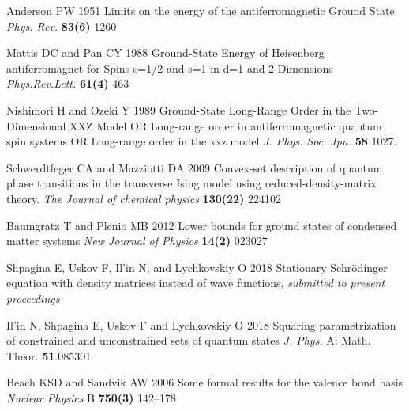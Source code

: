 \documentclass[a4paper]{jpconf}
\renewcommand\[{\begin{equation}}
\renewcommand\]{\end{equation}}
\begin{document}
\begin{thebibliography}{99}



 Anderson PW 1951
Limits on the energy of the antiferromagnetic Ground State
{\it Phys. Rev.} {\bf 83(6)} 1260

 Mattis DC and Pan CY 1988
Ground-State Energy of Heisenberg antiferromagnet for Spins s=1/2 and s=1 in d=1 and 2 Dimensions
{\it Phys.Rev.Lett.} {\bf 61(4)} 463

 Nishimori H and Ozeki Y 1989
Ground-State Long-Range Order in the Two-Dimensional XXZ Model OR
Long-range order in antiferromagnetic quantum spin systems OR
Long-range order in the xxz model
{\it J. Phys. Soc. Jpn.} {\bf 58} 1027.

 Schwerdtfeger CA and Mazziotti DA 2009
Convex-set description of quantum phase transitions in the transverse Ising model using reduced-density-matrix theory. 
{\it The Journal of chemical physics} {\bf 130(22)} 224102

 Baumgratz T and Plenio MB 2012
Lower bounds for ground states of condensed matter systems
{\it New Journal of Physics} {\bf 14(2)} 023027

  Shpagina E, Uskov F, Il'in N, and Lychkovskiy O 2018
Stationary Schrödinger equation with density matrices instead of wave functions,
{\it submitted to present proceedings}

 Il'in N, Shpagina E, Uskov F and Lychkovskiy O 2018
Squaring parametrization of constrained and unconstrained sets of quantum states
{\it J. Phys.} A: Math. Theor. {\bf 51}.085301

 Beach KSD and Sandvik AW 2006
Some formal results for the valence bond basis
{\it Nuclear Physics} B {\bf 750(3)} 142–178





\end{thebibliography}

\end{document}
